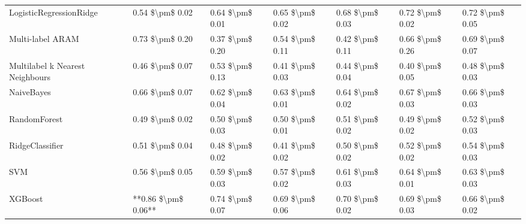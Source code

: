 \begin{tabular}{lllllll}
        LogisticRegressionRidge &     0.54 \$\textbackslash pm\$ 0.02 &           0.64 \$\textbackslash pm\$ 0.01 &       0.65 \$\textbackslash pm\$ 0.02 &        0.68 \$\textbackslash pm\$ 0.03 &                         0.72 \$\textbackslash pm\$ 0.02 & 0.72 \$\textbackslash pm\$ 0.05 \\
               Multi-label ARAM &     0.73 \$\textbackslash pm\$ 0.20 &           0.37 \$\textbackslash pm\$ 0.20 &       0.54 \$\textbackslash pm\$ 0.11 &        0.42 \$\textbackslash pm\$ 0.11 &                         0.66 \$\textbackslash pm\$ 0.26 & 0.69 \$\textbackslash pm\$ 0.07 \\
Multilabel k Nearest Neighbours &     0.46 \$\textbackslash pm\$ 0.07 &           0.53 \$\textbackslash pm\$ 0.13 &       0.41 \$\textbackslash pm\$ 0.03 &        0.44 \$\textbackslash pm\$ 0.04 &                         0.40 \$\textbackslash pm\$ 0.05 & 0.48 \$\textbackslash pm\$ 0.03 \\
                     NaiveBayes &     0.66 \$\textbackslash pm\$ 0.07 &           0.62 \$\textbackslash pm\$ 0.04 &       0.63 \$\textbackslash pm\$ 0.01 &        0.64 \$\textbackslash pm\$ 0.02 &                         0.67 \$\textbackslash pm\$ 0.03 & 0.66 \$\textbackslash pm\$ 0.03 \\
                   RandomForest &     0.49 \$\textbackslash pm\$ 0.02 &           0.50 \$\textbackslash pm\$ 0.03 &       0.50 \$\textbackslash pm\$ 0.01 &        0.51 \$\textbackslash pm\$ 0.02 &                         0.49 \$\textbackslash pm\$ 0.02 & 0.52 \$\textbackslash pm\$ 0.03 \\
                RidgeClassifier &     0.51 \$\textbackslash pm\$ 0.04 &           0.48 \$\textbackslash pm\$ 0.02 &       0.41 \$\textbackslash pm\$ 0.02 &        0.50 \$\textbackslash pm\$ 0.02 &                         0.52 \$\textbackslash pm\$ 0.02 & 0.54 \$\textbackslash pm\$ 0.03 \\
                            SVM &     0.56 \$\textbackslash pm\$ 0.05 &           0.59 \$\textbackslash pm\$ 0.03 &       0.57 \$\textbackslash pm\$ 0.02 &        0.61 \$\textbackslash pm\$ 0.03 &                         0.64 \$\textbackslash pm\$ 0.01 & 0.63 \$\textbackslash pm\$ 0.03 \\
                        XGBoost & **0.86 \$\textbackslash pm\$ 0.06** &           0.74 \$\textbackslash pm\$ 0.07 &       0.69 \$\textbackslash pm\$ 0.06 &        0.70 \$\textbackslash pm\$ 0.02 &                         0.69 \$\textbackslash pm\$ 0.03 & 0.66 \$\textbackslash pm\$ 0.02 \\
\bottomrule
\end{tabular}
